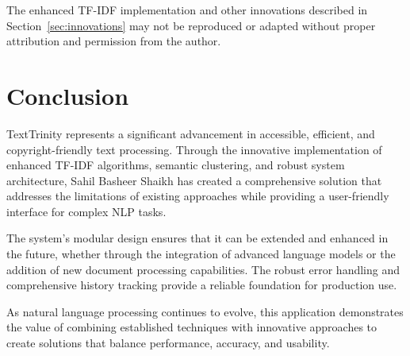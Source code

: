 \documentclass[12pt,a4paper]{article}
\begin{document}
The enhanced TF-IDF implementation and other innovations described in Section~\ref{sec:innovations} may not be reproduced or adapted without proper attribution and permission from the author.

\section{Conclusion}

TextTrinity represents a significant advancement in accessible, efficient, and copyright-friendly text processing. Through the innovative implementation of enhanced TF-IDF algorithms, semantic clustering, and robust system architecture, Sahil Basheer Shaikh has created a comprehensive solution that addresses the limitations of existing approaches while providing a user-friendly interface for complex NLP tasks.

The system's modular design ensures that it can be extended and enhanced in the future, whether through the integration of advanced language models or the addition of new document processing capabilities. The robust error handling and comprehensive history tracking provide a reliable foundation for production use.

As natural language processing continues to evolve, this application demonstrates the value of combining established techniques with innovative approaches to create solutions that balance performance, accuracy, and usability.
\end{document}
